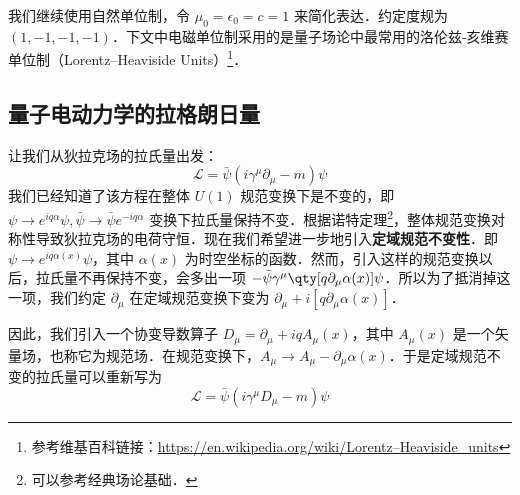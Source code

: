 

我们继续使用自然单位制，令 $\mu_0=\epsilon_0=c=1$ 来简化表达．约定度规为 $(1,-1,-1,-1)$．下文中电磁单位制采用的是量子场论中最常用的洛伦兹-亥维赛单位制（Lorentz–Heaviside Units）\footnote{参考维基百科链接：\href{https://en.wikipedia.org/wiki/Lorentz–Heaviside_units}{https://en.wikipedia.org/wiki/Lorentz–Heaviside_units}}．

\subsection{量子电动力学的拉格朗日量}
让我们从狄拉克场的拉氏量出发：
\begin{equation}
\mathcal{L}=\bar\psi (i\gamma^\mu \partial_\mu - m)\psi 
\end{equation}
我们已经知道了该方程在整体 $U(1)$ 规范变换下是不变的，即 $\psi\rightarrow e^{iq\alpha}\psi,\bar\psi \rightarrow \bar\psi e^{-iq\alpha}$ 变换下拉氏量保持不变．根据诺特定理\footnote{可以参考经典场论基础．}，整体规范变换对称性导致狄拉克场的电荷守恒．现在我们希望进一步地引入\textbf{定域规范不变性}．即 $\psi\rightarrow e^{iq\alpha(x)}\psi $，其中 $\alpha(x)$ 为时空坐标的函数．然而，引入这样的规范变换以后，拉氏量不再保持不变，会多出一项 $-\bar\psi \gamma^\mu \qty[q\partial_\mu \alpha(x)]\psi$．所以为了抵消掉这一项，我们约定 $\partial_\mu$ 在定域规范变换下变为 $\partial_\mu+i[q\partial_\mu \alpha(x)]$．

因此，我们引入一个协变导数算子 $D_\mu = \partial_\mu +iqA_\mu(x)$，其中 $A_\mu(x)$ 是一个矢量场，也称它为规范场．在规范变换下，$A_\mu\rightarrow A_\mu - \partial_\mu \alpha(x)$．于是定域规范不变的拉氏量可以重新写为
\begin{equation}
\mathcal{L}=\bar\psi(i\gamma^\mu D_\mu-m)\psi 
\end{equation}

